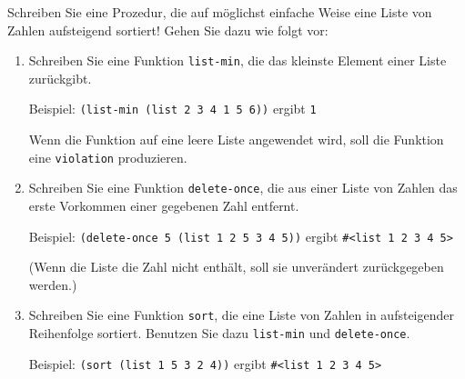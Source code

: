 \begin{aufgabe}
   Schreiben Sie eine Prozedur, die auf möglichst
  einfache Weise eine Liste von Zahlen aufsteigend sortiert! Gehen
  Sie dazu wie folgt vor:

  \begin{enumerate}
  \item Schreiben Sie eine Funktion
    \texttt{list-min}, die das kleinste Element einer
    Liste zurückgibt.

    Beispiel: \verb|(list-min (list 2 3 4 1 5 6))| ergibt \verb|1|

    Wenn die Funktion auf eine leere Liste angewendet
    wird, soll die Funktion eine \texttt{violation} produzieren.
  \item Schreiben Sie eine Funktion
    \texttt{delete-once}, die aus einer Liste von Zahlen das erste
    Vorkommen einer gegebenen Zahl entfernt.

    Beispiel: \verb|(delete-once 5 (list 1 2 5 3 4 5))| ergibt
    \verb|#<list 1 2 3 4 5>|
    
    (Wenn die Liste die Zahl nicht enthält,
    soll sie unverändert zurückgegeben werden.)
  \item  Schreiben Sie eine Funktion \texttt{sort}, die
    eine Liste von Zahlen in aufsteigender Reihenfolge sortiert.
    Benutzen Sie dazu \texttt{list-min} und \texttt{delete-once}.

    Beispiel: \verb|(sort (list 1 5 3 2 4))| ergibt
    \verb|#<list 1 2 3 4 5>|

  \end{enumerate}
\end{aufgabe}

